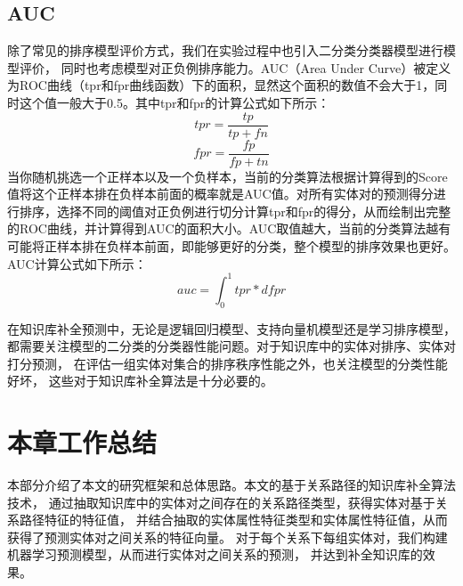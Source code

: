 \subsection{AUC}
除了常见的排序模型评价方式，我们在实验过程中也引入二分类分类器模型进行模型评价，
同时也考虑模型对正负例排序能力。AUC（Area Under Curve）被定义为ROC曲线（tpr和fpr曲线函数）下的面积，显然这个面积的数值不会大于1，同时这个值一般大于0.5。其中tpr和fpr的计算公式如下所示：
$$tpr=\frac{tp}{tp+fn}$$
$$fpr=\frac{fp}{fp+tn}$$
当你随机挑选一个正样本以及一个负样本，当前的分类算法根据计算得到的Score值将这个正样本排在负样本前面的概率就是AUC值。对所有实体对的预测得分进行排序，选择不同的阈值对正负例进行切分计算tpr和fpr的得分，从而绘制出完整的ROC曲线，并计算得到AUC的面积大小。AUC取值越大，当前的分类算法越有可能将正样本排在负样本前面，即能够更好的分类，整个模型的排序效果也更好。AUC计算公式如下所示：
$$auc=\int_{0}^{1}{tpr}*d{fpr}$$

在知识库补全预测中，无论是逻辑回归模型、支持向量机模型还是学习排序模型，
都需要关注模型的二分类的分类器性能问题。对于知识库中的实体对排序、实体对打分预测，
在评估一组实体对集合的排序秩序性能之外，也关注模型的分类性能好坏，
这些对于知识库补全算法是十分必要的。


\section{本章工作总结}
本部分介绍了本文的研究框架和总体思路。本文的基于关系路径的知识库补全算法技术，
通过抽取知识库中的实体对之间存在的关系路径类型，获得实体对基于关系路径特征的特征值，
并结合抽取的实体属性特征类型和实体属性特征值，从而获得了预测实体对之间关系的特征向量。
对于每个关系下每组实体对，我们构建机器学习预测模型，从而进行实体对之间关系的预测，
并达到补全知识库的效果。
